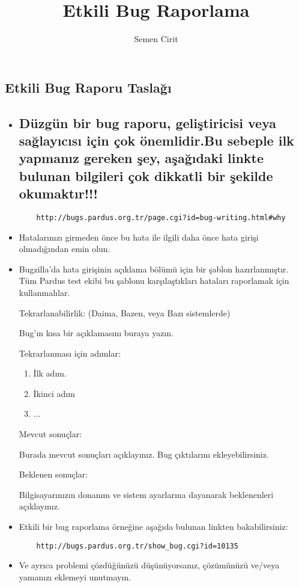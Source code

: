 \documentclass[a4paper,10pt]{article}
\title{Etkili Bug Raporlama}
\author{Semen Cirit}
\begin{document}
\maketitle

\subsection*{Etkili Bug Raporu Taslağı}

\begin{itemize}
 
  	\item \subsection*{Düzgün bir  bug raporu, geliştiricisi veya sağlayıcısı için çok önemlidir.Bu sebeple ilk yapmanız gereken şey, aşağıdaki linkte bulunan bilgileri çok dikkatli bir şekilde okumaktır!!!}
	\begin{verbatim} 
 	http://bugs.pardus.org.tr/page.cgi?id=bug-writing.html#why
	\end{verbatim}

	\item Hatalarınızı girmeden önce bu hata ile ilgili daha önce hata girişi olmadığından emin olun.
	
  	\item Bugzilla'da hata girişinin açıklama bölümü için bir şablon hazırlanmıştır. Tüm Pardus test ekibi bu şablonu karşılaştıkları hataları raporlamak için kullanmalılar.

   	Tekrarlanabilirlik: (Daima, Bazen, veya Bazı sistemlerde)	
   
    	Bug'ın kısa bir açıklamasını buraya yazın.
   
   	Tekrarlanması için adımlar:
   	\begin{enumerate}
    	\item İlk adım.
    	\item İkinci adım
    	\item ...
   	\end{enumerate}

	Mevcut sonuçlar:

	Burada mevcut sonuçları açıklayınız. Bug çıktılarını ekleyebilirsiniz.
	
	Beklenen sonuçlar:

	Bilgisayarınızın donanım ve sistem ayarlarına dayanarak beklenenleri açıklayınız.
	
	\item Etkili bir bug raporlama örneğine aşağıda bulunan linkten bakabilirsiniz:
	\begin{verbatim}
	http://bugs.pardus.org.tr/show_bug.cgi?id=10135
	\end{verbatim}
	\item Ve ayrıca problemi çözdüğünüzü düşünüyorsanız, çözümünüzü ve/veya yamanızı eklemeyi unutmayın.


\end{itemize}
\end{document}

